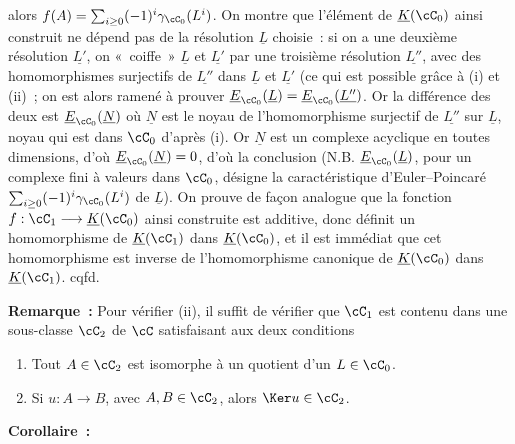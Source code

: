 alors $f(A)=\sum_{i\geq 0}(-1)^i\gamma_{\cC_0}(L^i)$.
On montre que l'élément de $\underline{K}(\cC_0)$ ainsi construit ne dépend pas de la résolution $\underline{L}$ choisie~: si on a une deuxième résolution $\underline{L'}$, on «~coiffe~» $\underline{L}$ et $\underline{L'}$ par une troisième résolution $\underline{L''}$, avec des homomorphismes surjectifs de $\underline{L''}$ dans $\underline{L}$ et $\underline{L'}$ (ce qui est possible grâce à (i) et (ii)~; on est alors ramené à prouver $\underline{E}_{\cC_0}(\underline{L})=\underline{E}_{\cC_0}(\underline{L''})$. Or la différence des deux est $\underline{E}_{\cC_0}(\underline{N})$ où $\underline{N}$ est le noyau de l'homomorphisme surjectif de $\underline{L''}$ sur $\underline{L}$, noyau qui est dans $\cC_0$ d'après (i). Or $\underline{N}$ est un complexe acyclique en toutes dimensions, d'où $\underline{E}_{\cC_0}(\underline{N})=0$, d'où la conclusion (N.B. $\underline{E}_{\cC_0}(\underline{L})$, pour un complexe fini à valeurs dans $\cC_0$, désigne la caractéristique d'Euler--Poincaré $\sum_{i\geq0}(-1)^i\gamma_{\cC_0}(L^i)$ de $\underline{L}$).
On prouve de façon analogue que la fonction $f:\cC_1\longrightarrow\underline{K}(\cC_0)$ ainsi construite est additive, donc définit un homomorphisme de $\underline{K}(\cC_1)$ dans $\underline{K}(\cC_0)$, et il est immédiat que cet homomorphisme est inverse de l'homomorphisme canonique de $\underline{K}(\cC_0)$ dans $\underline{K}(\cC_1)$. cqfd.

\textbf{Remarque~:} Pour vérifier (ii), il suffit de vérifier que $\cC_1$ est contenu dans une sous-classe $\cC_2$ de $\cC$ satisfaisant aux deux conditions
\begin{enumerate}[label=(ii \alph*)]
\item Tout $A\in\cC_2$ est isomorphe à un quotient d'un $L\in\cC_0$.
\item Si $u:A\to B$, avec $A,B\in\cC_2$, alors $\Ker u\in\cC_2$.
\end{enumerate}

\textbf{Corollaire~:}

